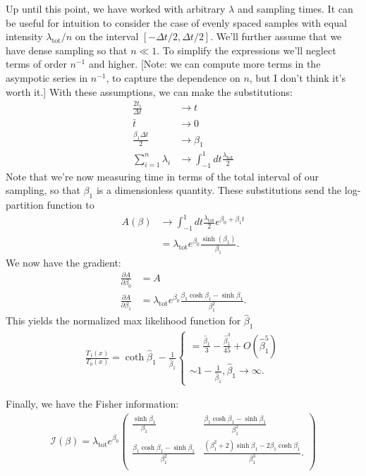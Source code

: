 \documentclass[12pt, letterpaper]{article}
\newcommand{ \lambtot }{\lambda_{\text{tot}}}
\begin{document}
Up until this point, we have worked with arbitrary $\lambda$ and sampling times.
It can be useful for intuition to consider the case of evenly spaced samples with equal intensity $\lambtot / n$ on the interval $[-\Delta t / 2, \Delta t / 2]$.
We'll further assume that we have dense sampling so that $n \ll 1$.
To simplify the expressions we'll neglect terms of order $n^{-1}$ and higher.
[Note: we can compute more terms in the asympotic series in $n^{-1}$, to capture the dependence on $n$, but I don't think it's worth it.]
With these assumptions, we can make the substitutions:
\begin{align}
    \frac{2 t_i}{\Delta t} & \to t \\
    \bar{t} & \to 0 \\
    \frac{\beta_1 \Delta t}{2} & \to \beta_1 \\
    \sum_{i=1}^{n} \lambda_i & \to \int_{-1}^{1} dt \frac{\lambtot}{2}
\end{align}
Note that we're now measuring time in terms of the total interval of our sampling, so that $\beta_1$ is a dimensionless quantity.
These substitutions send the log-partition function to
\begin{align}
    A(\beta) & \to \int_{-1}^{1} dt \frac{\lambtot}{2} e^{\beta_0 + \beta_1 t} \\
             & = \lambtot e^{\beta_0} \frac{\sinh(\beta_1)}{\beta_1}.
\end{align}
We now have the gradient:
\begin{align}
    \frac{\partial A}{\partial \beta_0} & = A \\
    \frac{\partial A}{\partial \beta_1} & = \lambtot e^{\beta_0} \frac{\beta_1 \cosh \beta_1 - \sinh \beta_1}{\beta_1^2}.
\end{align}
This yields the normalized max likelihood function for $\hat{\beta}_1$
\begin{align}
    \frac{T_1(x)}{T_0(x)} = \coth \hat{\beta}_1 - \frac{1}{\hat{\beta}_1}
    \begin{cases}
        = \frac{\hat{\beta}_1}{3} - \frac{\hat{\beta}_1^3}{45} + O(\hat{\beta}_1^5) \\
        \sim 1 - \frac{1}{\hat{\beta}_1}, \hat{\beta}_1 \to \infty.
    \end{cases}
\end{align}

Finally, we have the Fisher information:
\begin{align}
    \mathcal{I}(\beta) = \lambtot e^{\beta_0}
    \begin{pmatrix}
        \frac{\sinh \beta_1}{\beta_1} & \frac{\beta_1 \cosh \beta_1 - \sinh \beta_1}{\beta_1^2} \\
        \frac{\beta_1 \cosh \beta_1 - \sinh \beta_1}{\beta_1^2} &
        \frac{(\beta_1^2 + 2) \sinh \beta_1 - 2 \beta_1 \cosh \beta_1}{\beta_1^3}. \\
    \end{pmatrix}
\end{align}
\end{document}
